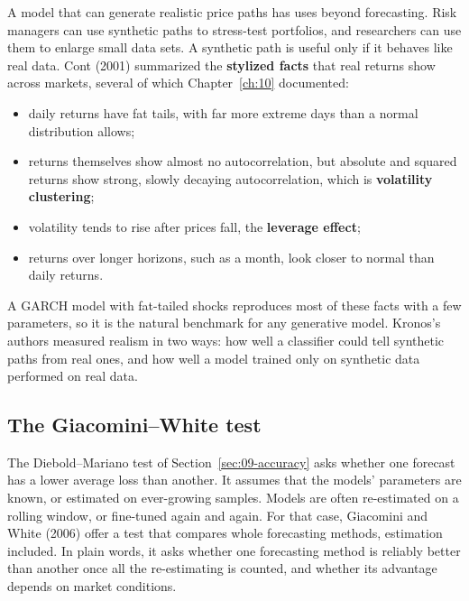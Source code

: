 A model that can generate realistic price paths has uses beyond forecasting. Risk managers can use synthetic paths to stress-test portfolios, and researchers can use them to enlarge small data sets. A synthetic path is useful only if it behaves like real data. Cont (2001) summarized the \textbf{stylized facts} that real returns show across markets, several of which Chapter~\ref{ch:10} documented:

\begin{itemize}
  \item daily returns have fat tails, with far more extreme days than a normal distribution allows;
  \item returns themselves show almost no autocorrelation, but absolute and squared returns show strong, slowly decaying autocorrelation, which is \textbf{volatility clustering};
  \item volatility tends to rise after prices fall, the \textbf{leverage effect};
  \item returns over longer horizons, such as a month, look closer to normal than daily returns.
\end{itemize}

A GARCH model with fat-tailed shocks reproduces most of these facts with a few parameters, so it is the natural benchmark for any generative model. Kronos's authors measured realism in two ways: how well a classifier could tell synthetic paths from real ones, and how well a model trained only on synthetic data performed on real data.

\subsection{The Giacomini--White test}

The Diebold--Mariano test of Section~\ref{sec:09-accuracy} asks whether one forecast has a lower average loss than another. It assumes that the models' parameters are known, or estimated on ever-growing samples. Models are often re-estimated on a rolling window, or fine-tuned again and again. For that case, Giacomini and White (2006) offer a test that compares whole forecasting methods, estimation included. In plain words, it asks whether one forecasting method is reliably better than another once all the re-estimating is counted, and whether its advantage depends on market conditions.

